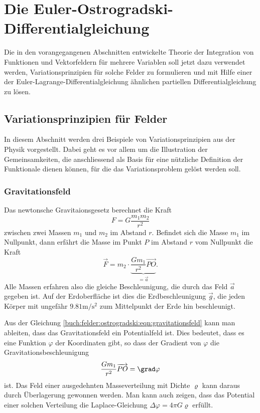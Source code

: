 %
%
%
\section{Die Euler-Ostrogradski-Differentialgleichung
\label{buch:felder:section:euler-ostrogradski}}
Die in den vorangegangenen Abschnitten entwickelte Theorie der
Integration von Funktionen und Vektorfeldern für mehrere Variablen
soll jetzt dazu verwendet werden, Variationsprinzipien für solche
Felder zu formulieren und mit Hilfe einer der
Euler-Lagrange-Differentialgleichung ähnlichen partiellen
Differentialgleichung zu lösen.

% 
%
\subsection{Variationsprinzipien für Felder}
In diesem Abschnitt werden drei Beispiele von Variationsprinzipien aus
der Physik vorgestellt.
Dabei geht es vor allem um die Illustration der Gemeinsamkeiten,
die anschliessend als Basis für eine nützliche Definition der
Funktionale dienen können, für die das Variationsproblem gelöst
werden soll.

%
%
\subsubsection{Gravitationsfeld}
Das newtonsche Gravitaionsgesetz berechnet die Kraft
\[
F = G \frac{m_1m_2}{r^2}
\]
zwischen zwei Massen $m_1$ und $m_2$ im Abstand $r$.
Befindet sich die Masse $m_1$ im Nullpunkt, dann erfährt die Masse im
Punkt $P$ im Abstand $r$ vom Nullpunkt die Kraft 
\begin{equation}
\vec{F}
=
m_2
\cdot
\underbrace{\frac{Gm_1}{r^2} \overrightarrow{PO}}_{\displaystyle =\vec{a}}.
\label{buch:felder:ostrogradski:eqn:gravitationsfeld}
\end{equation}
Alle Massen erfahren also die gleiche Beschleunigung, die durch das
Feld $\vec{a}$ gegeben ist.
Auf der Erdoberfläche ist dies die Erdbeschleunigung $\vec{g}$, die jeden
Körper mit ungefähr $9.81 \text{m}/\text{s}^2$ zum Mittelpunkt der
Erde hin beschleunigt.

Aus der Gleichung \eqref{buch:felder:ostrogradski:eqn:gravitationsfeld}
kann man ableiten, dass das Gravitationsfeld ein Potentialfeld ist.
Dies bedeutet, dass es eine Funktion $\varphi$ der Koordinaten gibt, 
so dass der Gradient von $\varphi$ die Gravitationsbeschleunigung
\[
\frac{Gm_1}{r^2}\overrightarrow{PO}
=
\grad\varphi
\]
ist.
Das Feld einer ausgedehnten Masseverteilung mit Dichte $\varrho$
kann daraus durch Überlagerung gewonnen werden.
Man kann auch zeigen, dass das Potential einer solchen Verteilung
die Laplace-Gleichung $\Delta \varphi = 4\pi G \varrho$ erfüllt.

